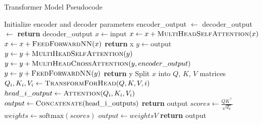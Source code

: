 \documentclass[10pt,twocolumn,letterpaper]{article}
\begin{document}
\begin{algorithm*}
   \caption{Transformer Model Pseudocode}
   \begin{algorithmic}[1] %
      \State Initialize encoder and decoder parameters
      \State encoder\_output $\gets$ 
      \State decoder\_output $\gets$ 
      \State \textbf{return} decoder\_output
      \EndProcedure
      \Statex
      \State $x \gets \text{input}$
      \State $x \gets x + \Call{MultiHeadSelfAttention}{x}$ 
      \State $x \gets x + \Call{FeedForwardNN}{x}$ 
      \EndFor
      \State \textbf{return} x
      \EndProcedure
      \Statex
      \State $y \gets \text{output}$
      \State $y \gets y + \Call{MultiHeadSelfAttention}{y}$ 
      \State $y \gets y + \Call{MultiHeadCrossAttention}{y, encoder\_output}$ 
      \State $y \gets y + \Call{FeedForwardNN}{y}$ 
      \EndFor
      \State \textbf{return} y
      \EndProcedure
      \Statex
      \State Split $x$ into $Q$, $K$, $V$ matrices 
      \State $Q_i, K_i, V_i \gets \Call{TransformForHead}{Q, K, V, i}$
      \State $head\_i\_output \gets \Call{Attention}{Q_i, K_i, V_i}$
      \EndFor
      \State $output \gets \Call{Concatenate}{\text{head\_i\_outputs}}$
      \State \textbf{return} output
      \EndFunction
      \Statex
      \State $scores \gets \frac{QK^\top}{\sqrt{d_k}}$
      \State $weights \gets \text{softmax}(scores)$
      \State $output \gets weights V$
      \State \textbf{return} output
      \EndFunction
   \end{algorithmic}
\end{algorithm*}

\end{document}
